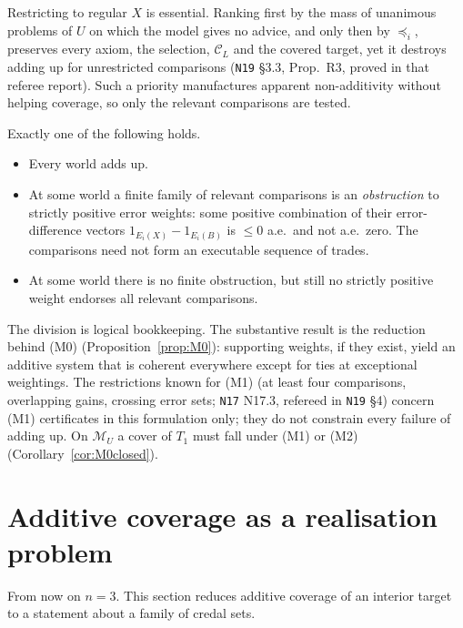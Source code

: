 \documentclass[11pt]{article}
\theoremstyle{definition}
\theoremstyle{remark}
\newcommand{\M}{\mathcal M}
\newcommand{\C}{\mathcal C}
\newcommand{\src}[1]{\texttt{#1}}
\begin{document}
Restricting to regular $X$ is essential. Ranking first by the mass of unanimous problems of $U$ on which the model gives no advice, and only then by $\preceq_i$, preserves every axiom, the selection, $\C_L$ and the covered target, yet it destroys adding up for unrestricted comparisons (\src{N19} \S3.3, Prop.~R3, proved in that referee report). Such a priority manufactures apparent non-additivity without helping coverage, so only the relevant comparisons are tested.

Exactly one of the following holds.
\begin{itemize}[leftmargin=*]
\item[\textbf{(M0)}] Every world adds up.
\item[\textbf{(M1)}] At some world a finite family of relevant comparisons is an \emph{obstruction} to strictly positive error weights: some positive combination of their error-difference vectors $1_{E_i(X)}-1_{E_i(B)}$ is $\le0$ a.e.\ and not a.e.\ zero. The comparisons need not form an executable sequence of trades.
\item[\textbf{(M2)}] At some world there is no finite obstruction, but still no strictly positive weight endorses all relevant comparisons.
\end{itemize}
The division is logical bookkeeping. The substantive result is the reduction behind (M0) (Proposition~\ref{prop:M0}): supporting weights, if they exist, yield an additive system that is coherent everywhere except for ties at exceptional weightings. The restrictions known for (M1) (at least four comparisons, overlapping gains, crossing error sets; \src{N17} N17.3, refereed in \src{N19} \S4) concern (M1) certificates in this formulation only; they do not constrain every failure of adding up. On $\M_U$ a cover of $T_1$ must fall under (M1) or (M2) (Corollary~\ref{cor:M0closed}).

\section{Additive coverage as a realisation problem}\label{sec:reduction}

From now on $n=3$. This section reduces additive coverage of an interior target to a statement about a family of credal sets.
\end{document}
